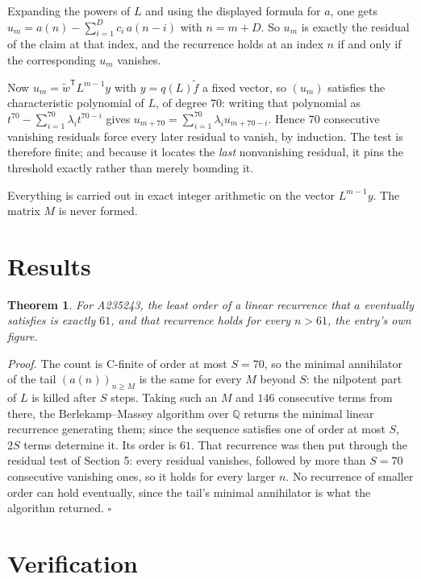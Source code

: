 \documentclass[11pt]{article}
\newtheorem{theorem}{Theorem}
\theoremstyle{definition}
\begin{document}
Expanding the powers of $L$ and using the displayed formula for $a$, one gets $u_m = a(n) - \sum_{i=1}^{D} c_i\,a(n-i)$ with $n = m + D$. So $u_m$ is exactly the residual of the claim at that index, and the recurrence holds at an index $n$ if and only if the corresponding $u_m$ vanishes.

Now $u_m = \tilde w^{\mathsf T} L^{m-1} y$ with $y = q(L)\tilde f$ a fixed vector, so $(u_m)$ satisfies the characteristic polynomial of $L$, of degree $70$: writing that polynomial as $t^{70} - \sum_{i=1}^{70} \lambda_i t^{70-i}$ gives $u_{m+70} = \sum_{i=1}^{70} \lambda_i u_{m+70-i}$. Hence $70$ consecutive vanishing residuals force every later residual to vanish, by induction. The test is therefore finite; and because it locates the {\itshape last} nonvanishing residual, it pins the threshold exactly rather than merely bounding it.

Everything is carried out in exact integer arithmetic on the vector $L^{m-1}y$. The matrix $M$ is never formed.

\section{Results}

\begin{theorem} For A235243, the least order of a linear recurrence that $a$ eventually satisfies is exactly $61$, and that recurrence holds for every $n > 61$, the entry's own figure.\end{theorem}

{\itshape Proof.} The count is C-finite of order at most $S = 70$, so the minimal annihilator of the tail $(a(n))_{n \ge M}$ is the same for every $M$ beyond $S$: the nilpotent part of $L$ is killed after $S$ steps. Taking such an $M$ and $146$ consecutive terms from there, the Berlekamp--Massey algorithm over $\mathbb{Q}$ returns the minimal linear recurrence generating them; since the sequence satisfies one of order at most $S$, $2S$ terms determine it. Its order is $61$. That recurrence was then put through the residual test of Section 5: every residual vanishes, followed by more than $S = 70$ consecutive vanishing ones, so it holds for every larger $n$. No recurrence of smaller order can hold eventually, since the tail's minimal annihilator is what the algorithm returned. $\square$

\section{Verification}
\end{document}
